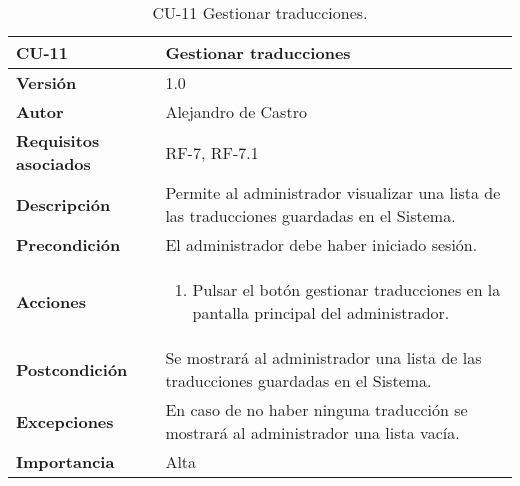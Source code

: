 \begin{table}[p]
	\centering
	\begin{tabularx}{\linewidth}{ p{} p{} }
		\toprule
		\textbf{CU-11}    & \textbf{Gestionar traducciones}\\
		\toprule
		\textbf{Versión}              & 1.0    \\
		\textbf{Autor}                & {Alejandro de Castro} \\
		\textbf{Requisitos asociados} & RF-7, RF-7.1 \\
		\textbf{Descripción}          & Permite al administrador visualizar una lista de las traducciones guardadas en el Sistema. \\
		\textbf{Precondición}         & El administrador debe haber iniciado sesión. \\
        \textbf{Acciones}             &
		\begin{enumerate}
			\def\labelenumi{\arabic{enumi}.}
			\tightlist
			\item Pulsar el botón gestionar traducciones en la pantalla principal del administrador.
		\end{enumerate}\\ 
		\textbf{Postcondición}        & Se mostrará al administrador una lista de las traducciones guardadas en el Sistema. \\
		\textbf{Excepciones}          & En caso de no haber ninguna traducción se mostrará al administrador una lista vacía. \\
		\textbf{Importancia}          & Alta \\
		\bottomrule
	\end{tabularx}
	\caption{CU-11 Gestionar traducciones.}
\end{table}

